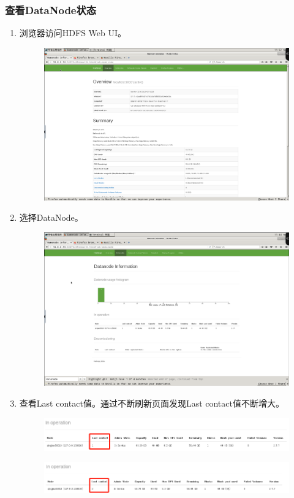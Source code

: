 \documentclass {article}
\begin{document}
			\subsubsection{查看DataNode状态}
				\begin{enumerate}
					\item 浏览器访问HDFS Web UI。
					\begin{figure}[H]
						\centering
						\includegraphics[width=4.5in]{figures/fig5.png}
					\end{figure}
				
					\item 选择DataNode。
					\begin{figure}[H]
						\centering
						\includegraphics[width=4.5in]{figures/fig6.png}
					\end{figure}
				
					\item 查看Last contact值。通过不断刷新页面发现Last contact值不断增大。
					\begin{figure}[H]
						\centering
						\includegraphics[width=4.5in]{figures/fig7.png}
					\end{figure}
					\begin{figure}[H]
						\centering
						\includegraphics[width=4.5in]{figures/fig8.png}
					\end{figure}
				\end{enumerate}
			
\end{document}
